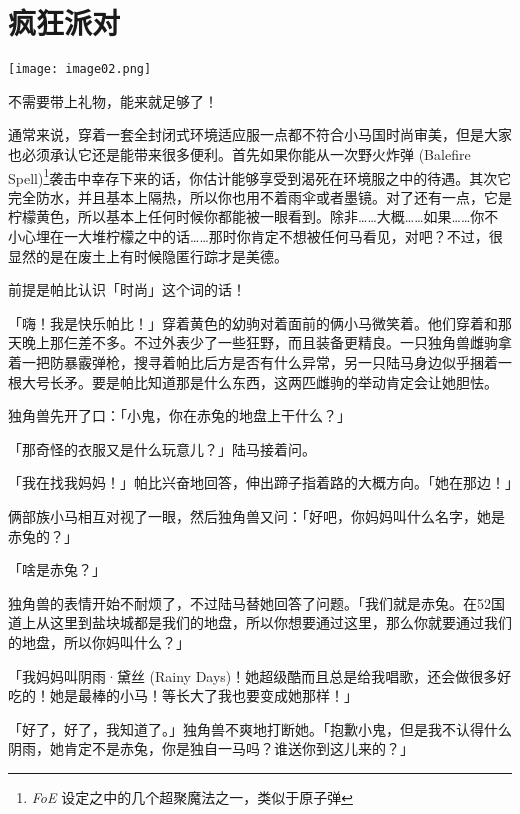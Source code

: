 \chapter{疯狂派对}

\texttt{[image: image02.png]}

\begin{intro}
    不需要带上礼物，能来就足够了！
\end{intro}


通常来说，穿着一套全封闭式环境适应服一点都不符合小马国时尚审美，但是大家也必须承认它还是能带来很多便利。首先如果你能从一次野火炸弹 (Balefire Spell)\footnote{\emph{FoE} 设定之中的几个超聚魔法之一，类似于原子弹}袭击中幸存下来的话，你估计能够享受到渴死在环境服之中的待遇。其次它完全防水，并且基本上隔热，所以你也用不着雨伞或者墨镜。对了还有一点，它是柠檬黄色，所以基本上任何时候你都能被一眼看到。除非……大概……如果……你不小心埋在一大堆柠檬之中的话……那时你肯定不想被任何马看见，对吧？不过，很显然的是在废土上有时候隐匿行踪才是美德。

前提是帕比认识「时尚」这个词的话！

\horizonline

「嗨！我是快乐帕比！」穿着黄色的幼驹对着面前的俩小马微笑着。他们穿着和那天晚上那仨差不多。不过外表少了一些狂野，而且装备更精良。一只独角兽雌驹拿着一把防暴霰弹枪，搜寻着帕比后方是否有什么异常，另一只陆马身边似乎捆着一根大号长矛。要是帕比知道那是什么东西，这两匹雌驹的举动肯定会让她胆怯。

独角兽先开了口：「小鬼，你在赤兔的地盘上干什么？」

「那奇怪的衣服又是什么玩意儿？」陆马接着问。

「我在找我妈妈！」帕比兴奋地回答，伸出蹄子指着路的大概方向。「她在那边！」

俩部族小马相互对视了一眼，然后独角兽又问：「好吧，你妈妈叫什么名字，她是赤兔的？」

「啥是赤兔？」

独角兽的表情开始不耐烦了，不过陆马替她回答了问题。「我们就是赤兔。在52国道上从这里到盐块城都是我们的地盘，所以你想要通过这里，那么你就要通过我们的地盘，所以你妈叫什么？」

「我妈妈叫阴雨·黛丝 (Rainy Days)！她超级酷而且总是给我唱歌，还会做很多好吃的！她是最棒的小马！等长大了我也要变成她那样！」

「好了，好了，我知道了。」独角兽不爽地打断她。「抱歉小鬼，但是我不认得什么阴雨，她肯定不是赤兔，你是独自一马吗？谁送你到这儿来的？」

